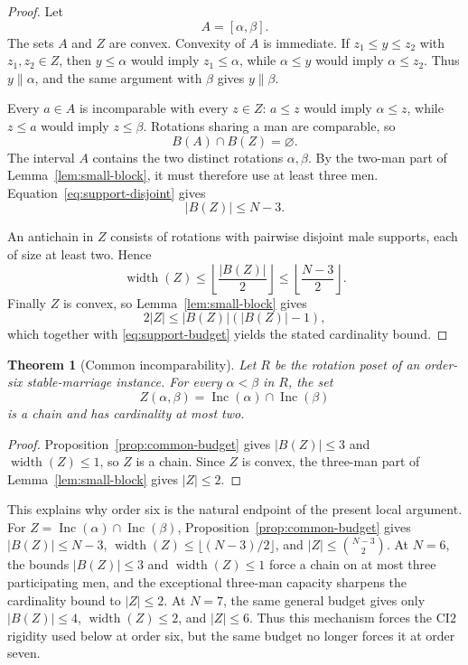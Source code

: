 \documentclass[11pt]{article}
\numberwithin{equation}{section}
\newtheorem{theorem}{Theorem}[section]
\theoremstyle{definition}
\theoremstyle{remark}
\newcommand{\Inc}{\operatorname{Inc}}
\begin{document}
\begin{proof}
Let
\[
        A=[\alpha,\beta].
\]
The sets $A$ and $Z$ are convex.  Convexity of $A$ is immediate.  If
$z_1\le y\le z_2$ with $z_1,z_2\in Z$, then $y\le\alpha$ would imply
$z_1\le\alpha$, while $\alpha\le y$ would imply $\alpha\le z_2$.
Thus $y\parallel\alpha$, and the same argument with $\beta$ gives
$y\parallel\beta$.

Every $a\in A$ is incomparable with every $z\in Z$: $a\le z$ would imply
$\alpha\le z$, while $z\le a$ would imply $z\le\beta$.  Rotations sharing
a man are comparable, so
\begin{equation}\label{eq:support-disjoint}
B(A)\cap B(Z)=\varnothing.
\end{equation}
The interval $A$ contains the two distinct rotations $\alpha,\beta$.
By the two-man part of Lemma~\ref{lem:small-block}, it must therefore use
at least three men.  Equation~\eqref{eq:support-disjoint} gives
\begin{equation}\label{eq:support-budget}
|B(Z)|\le N-3.
\end{equation}

An antichain in $Z$ consists of rotations with pairwise disjoint male
supports, each of size at least two.  Hence
\[
        \operatorname{width}(Z)
        \le \left\lfloor\frac{|B(Z)|}{2}\right\rfloor
        \le \left\lfloor\frac{N-3}{2}\right\rfloor.
\]
Finally $Z$ is convex, so Lemma~\ref{lem:small-block} gives
\[
        2|Z|\le |B(Z)|(|B(Z)|-1),
\]
which together with \eqref{eq:support-budget} yields the stated cardinality bound.
\end{proof}

\begin{theorem}[Common incomparability]\label{thm:ci2}
Let $R$ be the rotation poset of an order-six stable-marriage instance.
For every $\alpha<\beta$ in $R$, the set
\[
        Z(\alpha,\beta)=\Inc(\alpha)\cap\Inc(\beta)
\]
is a chain and has cardinality at most two.
\end{theorem}

\begin{proof}
Proposition~\ref{prop:common-budget} gives $|B(Z)|\le3$ and
$\operatorname{width}(Z)\le1$, so $Z$ is a chain.  Since $Z$ is convex,
the three-man part of Lemma~\ref{lem:small-block} gives $|Z|\le2$.
\end{proof}

This explains why order six is the natural endpoint of the present local
argument.  For $Z=\Inc(\alpha)\cap\Inc(\beta)$,
Proposition~\ref{prop:common-budget} gives $|B(Z)|\le N-3$,
$\operatorname{width}(Z)\le\lfloor(N-3)/2\rfloor$, and
$|Z|\le\binom{N-3}{2}$.
At $N=6$, the bounds $|B(Z)|\le3$ and $\operatorname{width}(Z)\le1$
force a chain on at most three participating men, and the exceptional
three-man capacity sharpens the cardinality bound to $|Z|\le2$.
At $N=7$, the same general budget gives only $|B(Z)|\le4$,
$\operatorname{width}(Z)\le2$, and $|Z|\le6$.
Thus this mechanism forces the $\mathrm{CI2}$ rigidity used below at order
six, but the same budget no longer forces it at order seven.
\end{document}
